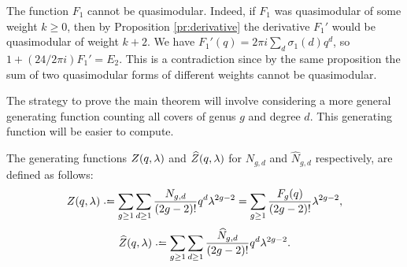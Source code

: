The function $F_1$ cannot be quasimodular. Indeed, if $F_1$ was quasimodular of some weight $k\geq0$, then by Proposition \ref{pr:derivative} the derivative $F_1'$ would be quasimodular of weight $k+2$. We have $F_1'(q)=2\pi i\sum_{d}\sigma_1(d)q^d$, so $1+(24/2\pi i)F_1'=E_2$. This is a contradiction since by the same proposition the sum of two quasimodular forms of different weights cannot be quasimodular.

The strategy to prove the main theorem will involve considering a more general generating function counting all covers of genus $g$ and degree $d$. This generating function will be easier to compute.

\begin{defi}
 The generating functions $Z(q,\lambda)$ and $\widehat{Z}(q,\lambda)$ for $N_{g,d}$ and $\widehat{N}_{g,d}$ respectively, are defined as follows:
 \[Z(q,\lam) \defeq \sum_{g\geq 1}\sum_{d\geq 1} \frac{N_{g,d}}{(2g-2)!}q^d\lam^{2g-2} 
 = \sum_{g\geq 1}\frac{F_g(q)}{(2g-2)!}\lam^{2g-2},\]
 \[\widehat{Z}(q,\lam) \defeq \sum_{g\geq 1}\sum_{d\geq 1} \frac{\widehat{N}_{g,d}}{(2g-2)!}q^d\lam^{2g-2}.\]
\end{defi}

